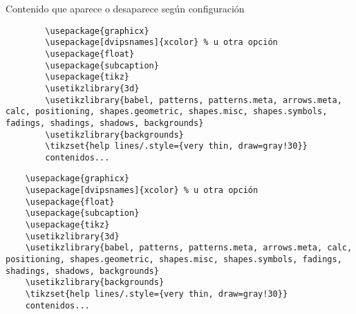 \vspace{5mm}

\begin{comment}
	Este texto largo con fórmulas $x^2$, 
	tablas, figuras, etc. será completamente 
	ignorado durante la compilación.
\end{comment}


\begin{notas}
	
	Contenido que aparece o desaparece según configuración
	
	\begin{verbatim}
		\usepackage{graphicx}
		\usepackage[dvipsnames]{xcolor} % u otra opción
		\usepackage{float}
		\usepackage{subcaption}
		\usepackage{tikz}
		\usetikzlibrary{3d}
		\usetikzlibrary{babel, patterns, patterns.meta, arrows.meta, calc, positioning, shapes.geometric, shapes.misc, shapes.symbols, fadings, shadings, shadows, backgrounds}
		\usetikzlibrary{backgrounds}
		\tikzset{help lines/.style={very thin, draw=gray!30}}
		contenidos...
	\end{verbatim}
\end{notas}

\begin{verbatim}
	\usepackage{graphicx}
	\usepackage[dvipsnames]{xcolor} % u otra opción
	\usepackage{float}
	\usepackage{subcaption}
	\usepackage{tikz}
	\usetikzlibrary{3d}
	\usetikzlibrary{babel, patterns, patterns.meta, arrows.meta, calc, positioning, shapes.geometric, shapes.misc, shapes.symbols, fadings, shadings, shadows, backgrounds}
	\usetikzlibrary{backgrounds}
	\tikzset{help lines/.style={very thin, draw=gray!30}}
	contenidos...
\end{verbatim}